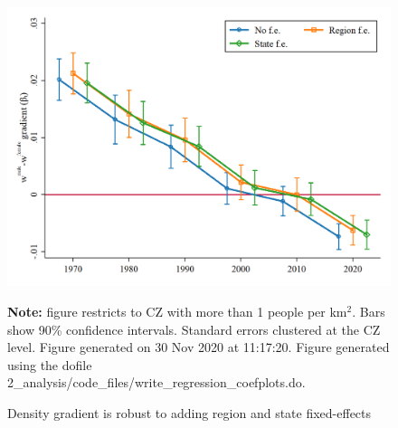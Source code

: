 \begin{figure}[!h]
\centering
\caption{Density gradient is robust to adding region and state fixed-effects}
\label{figure:baseline_gradients}
\includegraphics[width=1\textwidth]{../2_analysis/output/figures/region_fe_full_time.png}
\par \begin{minipage}[h]{\textwidth}{\tiny\textbf{Note:} figure restricts to CZ with more than 1 people per km$^2$. Bars show 90\% confidence intervals. Standard errors clustered at the CZ level. Figure generated on 30 Nov 2020 at 11:17:20. Figure generated using the dofile 2\_analysis/code\_files/write\_regression\_coefplots.do.}\end{minipage}
\end{figure}

